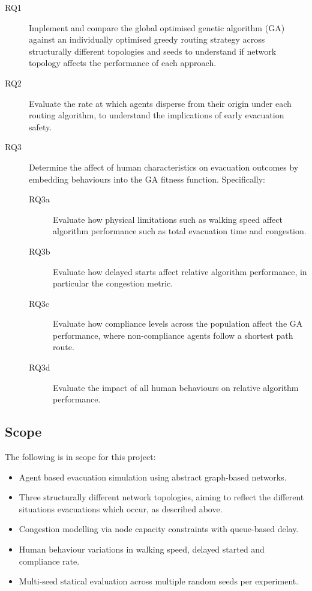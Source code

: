 \documentclass[12pt,a4paper]{report}
\begin{document}
\begin{description}
\item[RQ1]Implement and compare the global optimised genetic algorithm (GA) against an individually optimised greedy routing strategy across structurally different topologies and seeds to understand if network topology affects the performance of each approach.
\item[RQ2]Evaluate the rate at which agents disperse from their origin under each routing algorithm, to understand the implications of early evacuation safety.
\item[RQ3]Determine the affect of human characteristics on evacuation outcomes by embedding behaviours into the GA fitness function. Specifically:
\begin{description}
  \item[RQ3a]Evaluate how physical limitations such as walking speed affect algorithm performance such as total evacuation time and congestion.
  \item[RQ3b]Evaluate how delayed starts affect relative algorithm performance, in particular the congestion metric.
  \item[RQ3c]Evaluate how compliance levels across the population affect the GA performance, where non-compliance agents follow a shortest path route.
  \item[RQ3d]Evaluate the impact of all human behaviours on relative algorithm performance.
\end{description}
\end{description}

\subsection{Scope}

The following is in scope for this project:
\begin{itemize}
\item Agent based evacuation simulation using abstract graph-based networks.
\item Three structurally different network topologies, aiming to reflect the different situations evacuations which occur, as described above.
\item Congestion modelling via node capacity constraints with queue-based delay.
\item Human behaviour variations in walking speed, delayed started and compliance rate.
\item Multi-seed statical evaluation across multiple random seeds per experiment.
\end{itemize}  
\end{document}
